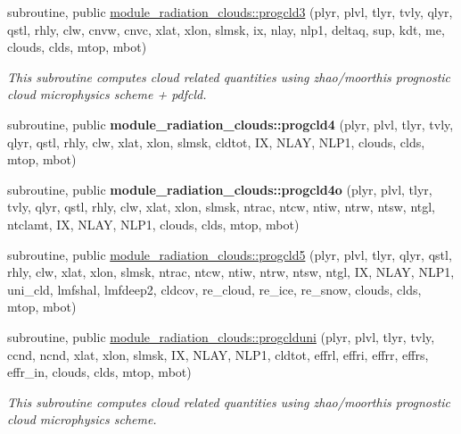 \textbf{ }\par
\begin{DoxyCompactItemize}
\item 
subroutine, public \hyperlink{group__module__radiation__clouds_gaeab51a06b22516fbfc78ab2c9eaf2622}{module\+\_\+radiation\+\_\+clouds\+::progcld3} (plyr, plvl, tlyr, tvly, qlyr, qstl, rhly, clw, cnvw, cnvc, xlat, xlon, slmsk, ix, nlay, nlp1, deltaq, sup, kdt, me, clouds, clds, mtop, mbot)
\begin{DoxyCompactList}\small\item\em This subroutine computes cloud related quantities using zhao/moorthi\textquotesingle{}s prognostic cloud microphysics scheme + pdfcld. \end{DoxyCompactList}\item 
subroutine, public {\bfseries module\+\_\+radiation\+\_\+clouds\+::progcld4} (plyr, plvl, tlyr, tvly, qlyr, qstl, rhly, clw, xlat, xlon, slmsk, cldtot, IX, N\+L\+AY, N\+L\+P1, clouds, clds, mtop, mbot)
\item 
subroutine, public {\bfseries module\+\_\+radiation\+\_\+clouds\+::progcld4o} (plyr, plvl, tlyr, tvly, qlyr, qstl, rhly, clw, xlat, xlon, slmsk, ntrac, ntcw, ntiw, ntrw, ntsw, ntgl, ntclamt, IX, N\+L\+AY, N\+L\+P1, clouds, clds, mtop, mbot)
\item 
subroutine, public \hyperlink{group__module__radiation__clouds_ga0c2a2c0d1abf49c1d6bbeb12d3223893}{module\+\_\+radiation\+\_\+clouds\+::progcld5} (plyr, plvl, tlyr, qlyr, qstl, rhly, clw, xlat, xlon, slmsk, ntrac, ntcw, ntiw, ntrw, ntsw, ntgl, IX, N\+L\+AY, N\+L\+P1, uni\+\_\+cld, lmfshal, lmfdeep2, cldcov, re\+\_\+cloud, re\+\_\+ice, re\+\_\+snow, clouds, clds, mtop, mbot)
\end{DoxyCompactItemize}

\textbf{ }\par
\begin{DoxyCompactItemize}
\item 
subroutine, public \hyperlink{group__module__radiation__clouds_gaa369e2e2910b3468614db856b378f3ba}{module\+\_\+radiation\+\_\+clouds\+::progclduni} (plyr, plvl, tlyr, tvly, ccnd, ncnd, xlat, xlon, slmsk, IX, N\+L\+AY, N\+L\+P1, cldtot, effrl, effri, effrr, effrs, effr\+\_\+in, clouds, clds, mtop, mbot)
\begin{DoxyCompactList}\small\item\em This subroutine computes cloud related quantities using zhao/moorthi\textquotesingle{}s prognostic cloud microphysics scheme. \end{DoxyCompactList}\end{DoxyCompactItemize}

